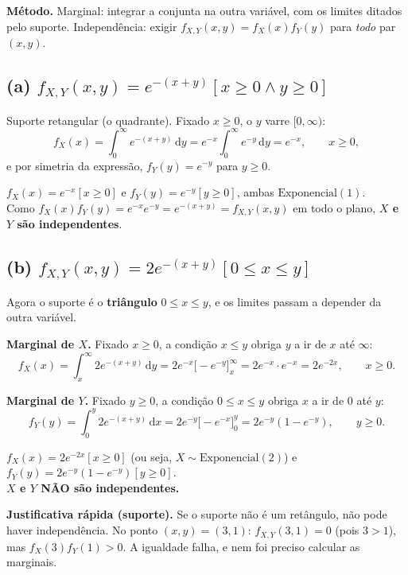 \documentclass[11pt,a4paper]{article}
\newcommand{\Ind}[1]{\left[#1\right]}
\newcommand{\dd}{\,\mathrm{d}}
\begin{document}
\textbf{Método.} Marginal: integrar a conjunta na outra variável, com os limites
ditados pelo suporte. Independência: exigir $f_{X,Y}(x,y)=f_X(x)f_Y(y)$ para
\emph{todo} par $(x,y)$.

\subsection*{(a) $f_{X,Y}(x,y)=e^{-(x+y)}\Ind{x\ge0 \wedge y\ge0}$}

Suporte retangular (o quadrante). Fixado $x\ge0$, o $y$ varre $[0,\infty)$:
\[
f_X(x)=\int_0^{\infty} e^{-(x+y)}\dd y = e^{-x}\int_0^{\infty} e^{-y}\dd y = e^{-x},
\qquad x\ge0,
\]
e por simetria da expressão, $f_Y(y)=e^{-y}$ para $y\ge0$.

\begin{resp}
$f_X(x)=e^{-x}\Ind{x\ge0}$ e $f_Y(y)=e^{-y}\Ind{y\ge0}$, ambas
$\text{Exponencial}(1)$.\\[3pt]
Como $f_X(x)f_Y(y)=e^{-x}e^{-y}=e^{-(x+y)}=f_{X,Y}(x,y)$ em todo o plano,
\textbf{$X$ e $Y$ são independentes}.
\end{resp}

\subsection*{(b) $f_{X,Y}(x,y)=2e^{-(x+y)}\Ind{0\le x\le y}$}

Agora o suporte é o \textbf{triângulo} $0\le x\le y$, e os limites passam a depender
da outra variável.

\medskip
\noindent\textbf{Marginal de $X$.} Fixado $x\ge0$, a condição $x\le y$ obriga $y$ a
ir de $x$ até $\infty$:
\[
f_X(x)=\int_{x}^{\infty} 2e^{-(x+y)}\dd y
=2e^{-x}\Big[-e^{-y}\Big]_{x}^{\infty}
=2e^{-x}\cdot e^{-x}=2e^{-2x}, \qquad x\ge0 .
\]

\noindent\textbf{Marginal de $Y$.} Fixado $y\ge0$, a condição $0\le x\le y$ obriga
$x$ a ir de $0$ até $y$:
\[
f_Y(y)=\int_{0}^{y} 2e^{-(x+y)}\dd x
=2e^{-y}\Big[-e^{-x}\Big]_{0}^{y}
=2e^{-y}\left(1-e^{-y}\right), \qquad y\ge0 .
\]

\begin{resp}
$f_X(x)=2e^{-2x}\Ind{x\ge0}$ (ou seja, $X\sim\text{Exponencial}(2)$) e
$f_Y(y)=2e^{-y}(1-e^{-y})\Ind{y\ge0}$.\\[3pt]
\textbf{$X$ e $Y$ NÃO são independentes.}
\end{resp}

\noindent\textbf{Justificativa rápida (suporte).} Se o suporte não é um retângulo,
não pode haver independência. No ponto $(x,y)=(3,1)$:
$f_{X,Y}(3,1)=0$ (pois $3>1$), mas $f_X(3)f_Y(1)>0$. A igualdade falha, e nem foi
preciso calcular as marginais.
\end{document}
